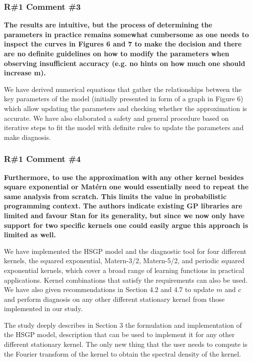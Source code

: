 \documentclass[11pt]{report}
\begin{document}
\subsubsection*{R\#1 Comment \#3}

\textbf{The results are intuitive, but the process of determining the parameters in practice remains somewhat cumbersome as one needs to inspect the curves in Figures 6 and 7 to make the decision and there are no definite guidelines on how to modify the parameters when observing insufficient accuracy (e.g. no hints on how much one should increase m).}

We have derived numerical equations that gather the relationships between the key parameters of the model (initially presented in form of a graph in Figure 6) which allow updating the parameters and checking whether the approximation is accurate. We have also elaborated a safety and general procedure based on iterative steps to fit the model with definite rules to update the parameters and make diagnosis.

\subsubsection*{R\#1 Comment \#4}

\textbf{Furthermore, to use the approximation with any other kernel besides square exponential or Matérn one would essentially need to repeat the same analysis from scratch. This limits the value in probabilistic programming context. The authors indicate existing GP  libraries are limited and favour Stan for its generality, but since we now only have support for two specific kernels one could easily argue this approach is limited as well.}

We have implemented the HSGP model and the diagnostic tool for four different kernels, the squared exponential, Matern-3/2, Matern-5/2, and periodic squared exponential kernels, which cover a broad range of learning functions in practical applications. Kernel combinations that satisfy the requirements can also be used. We have also given recommendations in Section 4.2 and 4.7 to update $m$ and $c$ and perform diagnosis on any other different stationary kernel from those implemented in our study.

The study deeply describes in Section 3 the formulation and implementation of the HSGP model, description that can be used to implement it for any other different stationary kernel. The only new thing that the user needs to compute is the Fourier transform of the kernel to obtain the spectral density of the kernel.
\end{document}
